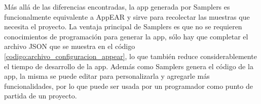 Más allá de las diferencias encontradas, la app generada por Samplers es funcionalmente equivalente a AppEAR y sirve para recolectar las muestras que necesita el proyecto. La ventaja principal de Samplers es que no se requieren conocimientos de programación para generar la app, sólo hay que completar el archivo JSON que se muestra en el código \ref{codigo:archivo_configuracion_appear}, lo que también reduce considerablemente el tiempo de desarrollo de la app. Además como Samplers genera el código de la app, la misma se puede editar para personalizarla y agregarle más funcionalidades, por lo que puede ser usada por un programador como punto de partida de un proyecto.



